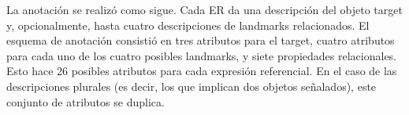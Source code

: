 




La anotaci\'on se realiz\'o como sigue. Cada ER da una descripci\'on del objeto target y, opcionalmente, hasta cuatro descripciones de landmarks relacionados. El esquema de anotaci\'on consisti\'o en tres atributos para el target, cuatro atributos para cada uno de los cuatro posibles landmarks, y siete propiedades relacionales. Esto hace 26 posibles atributos para cada expresi\'on referencial. En el caso de las descripciones plurales (es decir, los que implican dos objetos se\~{n}alados), este conjunto de atributos se duplica.

